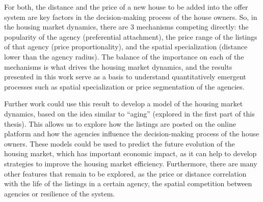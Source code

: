 For both, the distance and the price of a new house to be added into the offer system are key factors in the decision-making process of the house owners. So, in the housing market dynamics, there are 3 mechanisms competing directly: the popularity of the agency (preferential attachment), the price range of the listings of that agency (price proportionality), and the spatial specialization (distance lower than the agency radius). The balance of the importance on each of the mechanisms is what drives the housing market dynamics, and the results presented in this work serve as a basis to understand quantitatively emergent processes such as spatial specialization or price segmentation of the agencies.

Further work could use this result to develop a model of the housing market dynamics, based on the idea similar to ``aging'' (explored in the first part of this thesis). This allows us to explore how the listings are posted on the online platform and how the agencies influence the decision-making process of the house owners. These models could be used to predict the future evolution of the housing market, which has important economic impact, as it can help to develop strategies to improve the housing market efficiency. Furthermore, there are many other features that remain to be explored, as the price or distance correlation with the life of the listings in a certain agency, the spatial competition between agencies or resilience of the system.